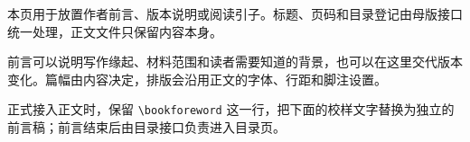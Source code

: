 \bookforeword

本页用于放置作者前言、版本说明或阅读引子。标题、页码和目录登记由母版接口统一处理，正文文件只保留内容本身。

前言可以说明写作缘起、材料范围和读者需要知道的背景，也可以在这里交代版本变化。篇幅由内容决定，排版会沿用正文的字体、行距和脚注设置。

正式接入正文时，保留 \texttt{\textbackslash bookforeword} 这一行，把下面的校样文字替换为独立的前言稿；前言结束后由目录接口负责进入目录页。
